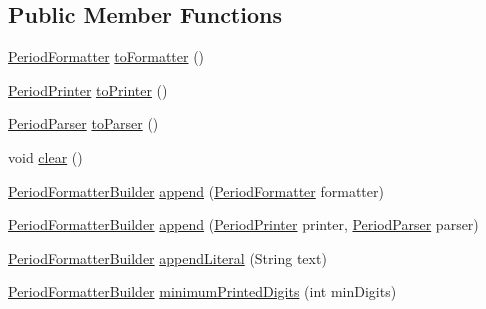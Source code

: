 \subsection*{Public Member Functions}
\begin{DoxyCompactItemize}
\item 
\hyperlink{classorg_1_1joda_1_1time_1_1format_1_1_period_formatter}{Period\-Formatter} \hyperlink{classorg_1_1joda_1_1time_1_1format_1_1_period_formatter_builder_af75c55ab98105a6102496c8efae19415}{to\-Formatter} ()
\item 
\hyperlink{interfaceorg_1_1joda_1_1time_1_1format_1_1_period_printer}{Period\-Printer} \hyperlink{classorg_1_1joda_1_1time_1_1format_1_1_period_formatter_builder_af5c0f4e9748681ec543c1d53e99263f9}{to\-Printer} ()
\item 
\hyperlink{interfaceorg_1_1joda_1_1time_1_1format_1_1_period_parser}{Period\-Parser} \hyperlink{classorg_1_1joda_1_1time_1_1format_1_1_period_formatter_builder_aaad0f7e97c6de342786211a9ac9953b7}{to\-Parser} ()
\item 
void \hyperlink{classorg_1_1joda_1_1time_1_1format_1_1_period_formatter_builder_a4b8d8fd5df23475664133dd3da32ac12}{clear} ()
\item 
\hyperlink{classorg_1_1joda_1_1time_1_1format_1_1_period_formatter_builder}{Period\-Formatter\-Builder} \hyperlink{classorg_1_1joda_1_1time_1_1format_1_1_period_formatter_builder_a51fdd2eec496ec58cbb6446bd8467e66}{append} (\hyperlink{classorg_1_1joda_1_1time_1_1format_1_1_period_formatter}{Period\-Formatter} formatter)
\item 
\hyperlink{classorg_1_1joda_1_1time_1_1format_1_1_period_formatter_builder}{Period\-Formatter\-Builder} \hyperlink{classorg_1_1joda_1_1time_1_1format_1_1_period_formatter_builder_a56609ad28732e572d0f7ccd6d0174d9c}{append} (\hyperlink{interfaceorg_1_1joda_1_1time_1_1format_1_1_period_printer}{Period\-Printer} printer, \hyperlink{interfaceorg_1_1joda_1_1time_1_1format_1_1_period_parser}{Period\-Parser} parser)
\item 
\hyperlink{classorg_1_1joda_1_1time_1_1format_1_1_period_formatter_builder}{Period\-Formatter\-Builder} \hyperlink{classorg_1_1joda_1_1time_1_1format_1_1_period_formatter_builder_ab1571e13e404e8378cefa09c9f312957}{append\-Literal} (String text)
\item 
\hyperlink{classorg_1_1joda_1_1time_1_1format_1_1_period_formatter_builder}{Period\-Formatter\-Builder} \hyperlink{classorg_1_1joda_1_1time_1_1format_1_1_period_formatter_builder_a38e5a26e1ece0f22998f32ce8a8780aa}{minimum\-Printed\-Digits} (int min\-Digits)

\end{DoxyCompactItemize}
